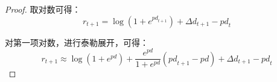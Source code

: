 \documentclass[11pt]{article}
\begin{document}
\begin{appendices}
\begin{proof}
    取对数可得：
    \begin{equation*}
        r_{t+1} = \log \left( 1+ e^{{pd}_{t+1}} \right) + \Delta d_{t+1} - {pd}_t
    \end{equation*}

    对第一项对数，进行泰勒展开，可得：
    \begin{equation*}
        r_{t+1} \approx \log \left( 1+ e^{pd} \right) + \frac{e^{pd}}{1+ e^{pd}}({pd}_{t+1} - {pd}) + \Delta d_{t+1} - {pd}_t
    \end{equation*}


\end{proof}



\end{appendices}
\end{document}
